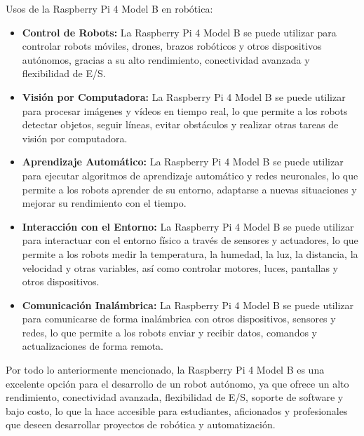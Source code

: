     \vskip 0.5cm
    Usos de la Raspberry Pi 4 Model B en rob\'otica:
    \begin{itemize}
        \item \textbf{Control de Robots:} La Raspberry Pi 4 Model B se puede utilizar para controlar robots m\'oviles, 
            drones, brazos rob\'oticos y otros dispositivos aut\'onomos, gracias a su alto rendimiento, conectividad avanzada
            y flexibilidad de E/S.
        \item \textbf{Visi\'on por Computadora:} La Raspberry Pi 4 Model B se puede utilizar para procesar im\'agenes y 
            v\'ideos en tiempo real, lo que permite a los robots detectar objetos, seguir l\'ineas, evitar obst\'aculos y 
            realizar otras tareas de visi\'on por computadora.
        \item \textbf{Aprendizaje Autom\'atico:} La Raspberry Pi 4 Model B se puede utilizar para ejecutar algoritmos de 
            aprendizaje autom\'atico y redes neuronales, lo que permite a los robots aprender de su entorno, adaptarse a 
            nuevas situaciones y mejorar su rendimiento con el tiempo.
        \item \textbf{Interacci\'on con el Entorno:} La Raspberry Pi 4 Model B se puede utilizar para interactuar con el 
            entorno f\'isico a trav\'es de sensores y actuadores, lo que permite a los robots medir la temperatura, la 
            humedad, la luz, la distancia, la velocidad y otras variables, as\'i como controlar motores, luces, pantallas 
            y otros dispositivos.
        \item \textbf{Comunicaci\'on Inal\'ambrica:} La Raspberry Pi 4 Model B se puede utilizar para comunicarse de forma 
            inal\'ambrica con otros dispositivos, sensores y redes, lo que permite a los robots enviar y recibir datos, 
            comandos y actualizaciones de forma remota.
    \end{itemize}
    \vskip 0.5cm
    Por todo lo anteriormente mencionado, la Raspberry Pi 4 Model B es una excelente opci\'on para el desarrollo de un robot 
        aut\'onomo, ya que ofrece un alto rendimiento, conectividad avanzada, flexibilidad de E/S, soporte de software y bajo 
        costo, lo que la hace accesible para estudiantes, aficionados y profesionales que deseen desarrollar proyectos de rob\'otica 
        y automatizaci\'on.
